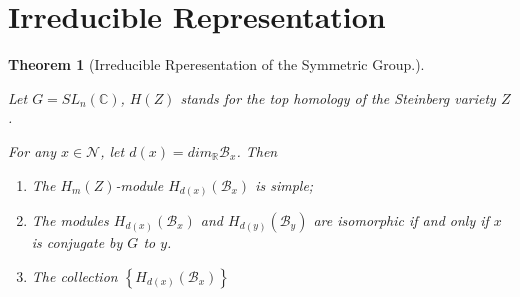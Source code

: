 \documentclass[a4paper]{article}
\newcommand{\C}{\mathbb{C}}
\newcommand{\R}{\mathbb{R}}
\newtheorem{theorem}{Theorem}[section]
\begin{document}
\section{Irreducible Representation}
\begin{theorem}[Irreducible Rperesentation of the Symmetric Group.]
	\citep{chriss_representation_2010}

	Let $G = SL_n(\C)$,  $H(Z)$ stands for the top homology of the Steinberg variety  $Z$.

	For any  $x \in \mathcal{N}$, let $d(x) = dim_{\R}\mathcal{B}_x$. Then

	\begin{enumerate}
		\item The $H_m(Z)$-module  $H_{d(x)}(\mathcal{B}_x)$ is simple;
		\item The modules $H_{d(x)}(\mathcal{B}_x)$ and $H_{d(y)}(\mathcal{B}_y)$ are isomorphic if and only if $x$ is conjugate by  $G$ to  $y$.
		\item The collection  $\left\{ H_{d(x)}(\mathcal{B}_x)  \right\} $
		
	\end{enumerate}
	
\end{theorem}


\nocite{*}

\newpage

\end{document}
